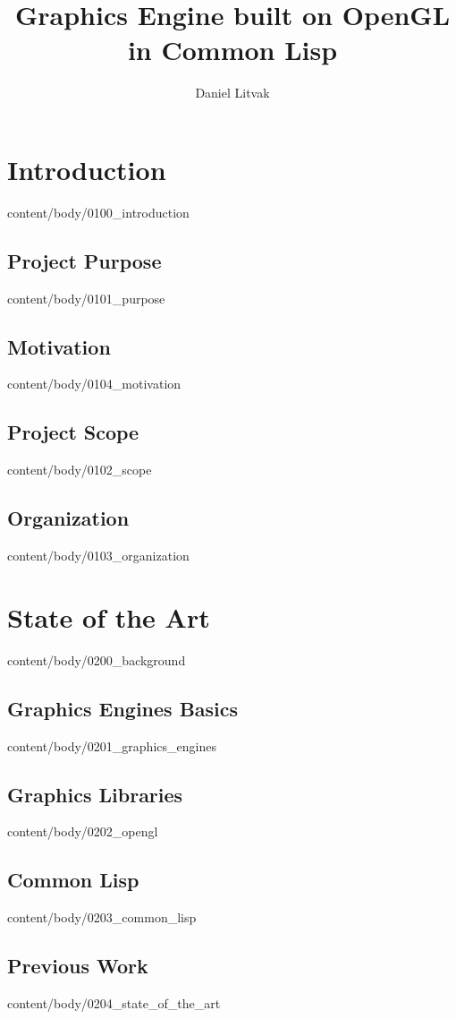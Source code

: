 \documentclass[english, tfg, loc, lof, firstnumbered, epsbased]{tfgtfmthesisuam}
\title{Graphics Engine built on OpenGL in Common Lisp}
\author{Daniel Litvak}
\begin{document}



\chapter{Introduction}{content/body/0100_introduction}                              %
  \section{Project Purpose}{content/body/0101_purpose}                              %
  \section{Motivation}{content/body/0104_motivation}                                %
  \section{Project Scope}{content/body/0102_scope}                                  %
  \section{Organization}{content/body/0103_organization}                            %

\chapter{State of the Art}{content/body/0200_background}                            %
  \section{Graphics Engines Basics}{content/body/0201_graphics_engines}             %
  \section{Graphics Libraries}{content/body/0202_opengl}                            %
  \section{Common Lisp}{content/body/0203_common_lisp}                              %
  \section{Previous Work}{content/body/0204_state_of_the_art}                       %
\end{document}
